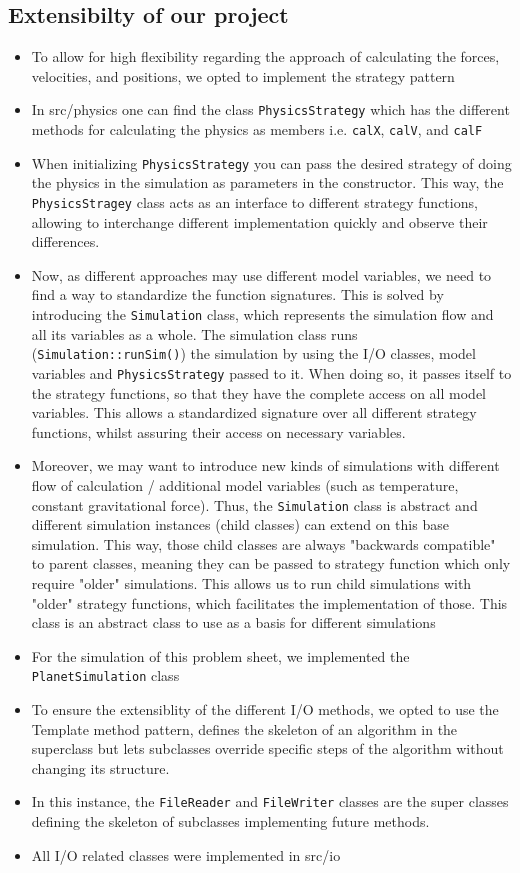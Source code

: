 \documentclass{article}
\begin{document}
\subsection{Extensibilty of our project}
\begin{itemize}
    \item To allow for high flexibility regarding the approach of calculating the forces, velocities, and positions, we opted to implement the strategy pattern
    \item In src/physics one can find the class \verb|PhysicsStrategy| which has the different methods for calculating the physics as members i.e. \verb|calX|, \verb|calV|, and \verb|calF|
    \item When initializing \verb|PhysicsStrategy| you can pass the desired strategy of doing the physics in the simulation as parameters in the constructor. This way, the \verb|PhysicsStragey| class acts as an interface to different strategy functions, allowing to interchange different implementation quickly and observe their differences.
    \item Now, as different approaches may use different model variables, we need to find a way to standardize the function signatures. This is solved by introducing the \verb|Simulation| class, which represents the simulation flow and all its variables as a whole. The simulation class runs (\verb|Simulation::runSim()|) the simulation by using the I/O classes, model variables and \verb|PhysicsStrategy| passed to it. When doing so, it passes itself to the strategy functions, so that they have the complete access on all model variables. This allows a standardized signature over all different strategy functions, whilst assuring their access on necessary variables.
    \item Moreover, we may want to introduce new kinds of simulations with different flow of calculation / additional model variables (such as temperature, constant gravitational force). Thus, the \verb|Simulation| class is abstract and different simulation instances (child classes) can extend on this base simulation. This way, those child classes are always "backwards compatible" to parent classes, meaning they can be passed to strategy function which only require "older" simulations. This allows us to run child simulations with "older" strategy functions, which facilitates the implementation of those.
        This class is an abstract class to use as a basis for different simulations
    \item For the simulation of this problem sheet, we implemented the \verb|PlanetSimulation| class

    \item To ensure the extensiblity of the different I/O methods, we opted to use the Template method pattern,  defines the skeleton of an algorithm in the superclass but lets subclasses override specific steps of the algorithm without changing its structure.
    \item In this instance, the \verb|FileReader| and \verb|FileWriter| classes are the super classes defining the skeleton of subclasses implementing future methods. 
    \item All I/O related classes were implemented in src/io
\end{itemize}
\end{document}
